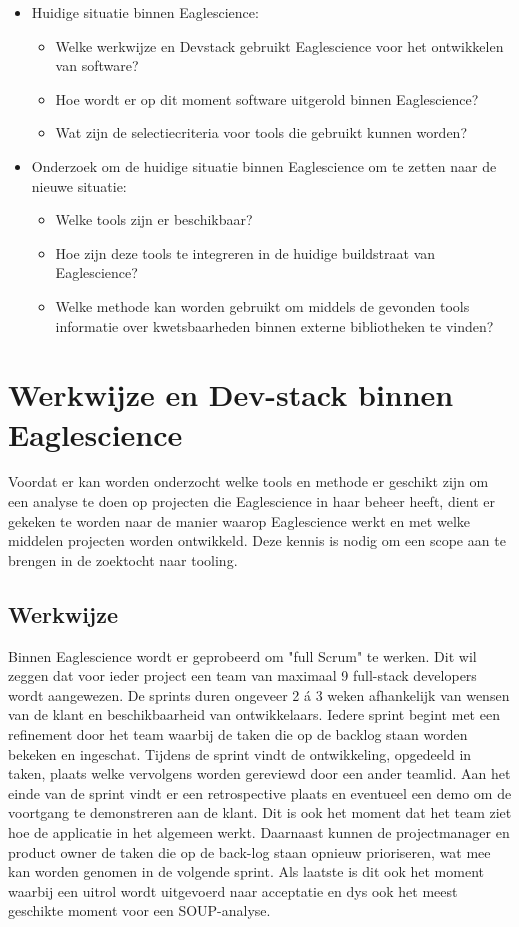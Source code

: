 \begin{itemize}
    \item Huidige situatie binnen Eaglescience:
    \begin{itemize}
        \item Welke werkwijze en Dev\-stack gebruikt Eaglescience voor het ontwikkelen van software?
        \item Hoe wordt er op dit moment software uitgerold binnen Eaglescience?
        \item Wat zijn de selectiecriteria voor tools die gebruikt kunnen worden?
    \end{itemize}

    \item Onderzoek om de huidige situatie binnen Eaglescience om te zetten naar de nieuwe situatie:
    \begin{itemize}
        \item Welke tools zijn er beschikbaar?
        \item Hoe zijn deze tools te integreren in de huidige buildstraat van Eaglescience?
        \item Welke methode kan worden gebruikt om middels de gevonden tools informatie over kwetsbaarheden binnen externe bibliotheken te vinden?
    \end{itemize}
\end{itemize}


\section{Werkwijze en Dev-stack binnen Eaglescience}\label{sec:werkwijze-en-dev-stack-binnen-eaglescience}
Voordat er kan worden onderzocht welke tools en methode er geschikt zijn om een analyse te doen op projecten die Eaglescience in haar beheer heeft, dient er gekeken te worden naar de manier waarop Eaglescience werkt en met welke middelen projecten worden ontwikkeld. Deze kennis is nodig om een scope aan te brengen in de zoektocht naar tooling.

\subsection{Werkwijze}\label{subsec:ESwerkwijze}
Binnen Eaglescience wordt er geprobeerd om "full Scrum" te werken. Dit wil zeggen dat voor ieder project een team van maximaal 9 full-stack developers wordt aangewezen. De sprints duren ongeveer 2 á 3 weken afhankelijk van wensen van de klant en beschikbaarheid van ontwikkelaars. Iedere sprint begint met een refinement door het team waarbij de taken die op de backlog staan worden bekeken en ingeschat. Tijdens de sprint vindt de ontwikkeling, opgedeeld in taken, plaats welke vervolgens worden gereviewd door een ander teamlid. Aan het einde van de sprint vindt er een retrospective plaats en eventueel een demo om de voortgang te demonstreren aan de klant. Dit is ook het moment dat het team ziet hoe de applicatie in het algemeen werkt. Daarnaast kunnen de projectmanager en product owner de taken die op de back-log staan opnieuw prioriseren, wat mee kan worden genomen in de volgende sprint. Als laatste is dit ook het moment waarbij een uitrol wordt uitgevoerd naar acceptatie en dys ook het meest geschikte moment voor een SOUP-analyse.

